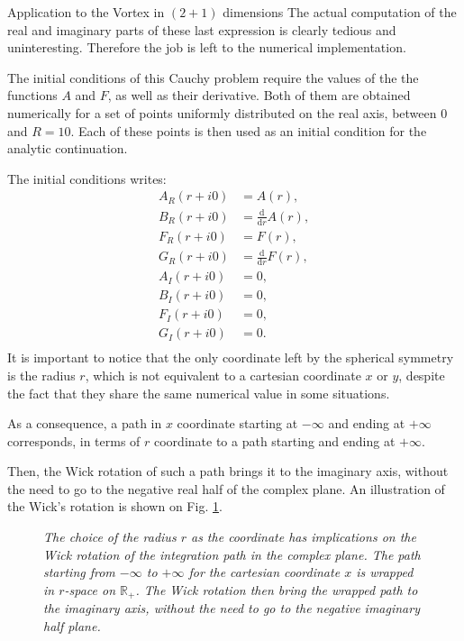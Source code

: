 \begin{section}{Application to the Vortex in $(2+1)$ dimensions}
  The actual computation of the real and imaginary parts of these last
  expression is clearly tedious and uninteresting. Therefore the job
  is left to the numerical implementation.

  The initial conditions of this Cauchy problem require the values of
  the the functions $A$ and $F$, as well as their derivative. Both of
  them are obtained numerically for a set of points uniformly
  distributed on the real axis, between $0$ and $R = 10$. Each of
  these points is then used as an initial condition for the analytic
  continuation.

  The initial conditions writes:
  \begin{align}
    A_R(r+i0) &= A(r),\\
    B_R(r+i0) &= \frac{\mathrm d}{\mathrm d r}A(r),\\
    F_R(r+i0) &= F(r),\\
    G_R(r+i0) &= \frac{\mathrm d}{\mathrm d r}F(r),\\
    A_I(r+i0) &= 0,\\
    B_I(r+i0) &= 0,\\
    F_I(r+i0) &= 0,\\
    G_I(r+i0) &= 0.\\
  \end{align}
  It is important to notice that the only coordinate left by the
  spherical symmetry is the radius $r$, which is not equivalent to a
  cartesian coordinate $x$ or $y$, despite the fact that they share
  the same numerical value in some situations.

  As a consequence, a path in $x$ coordinate starting at $-\infty$ and
  ending at $+\infty$ corresponds, in terms of $r$ coordinate to a path
  starting and ending at $+\infty$.

  Then, the Wick rotation of such a path brings it to the imaginary
  axis, without the need to go to the negative real half of the
  complex plane. An illustration of the Wick's rotation is shown on
  Fig. \ref{fig:s_path}.

  \begin{figure}[!ht]
    \begin{center}
      
      \caption{\em The choice of the radius $r$ as the coordinate has
        implications on the Wick rotation of the integration path in
        the complex plane. The path starting from $-\infty$ to
        $+\infty$ for the cartesian coordinate $x$ is wrapped in
        $r$-space on $\mathbb{R}_+$. The Wick rotation then bring the
        wrapped path to the imaginary axis, without the need to go to the
        negative imaginary half plane.}
      \label{fig:s_path}
    \end{center}
  \end{figure}
  

\end{section}

